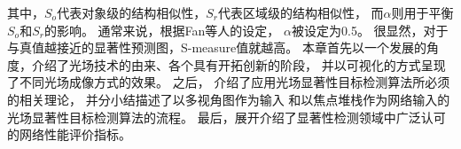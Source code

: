 %
%
其中，$S_{o}$代表对象级的结构相似性，$S_{r}$代表区域级的结构相似性，
而$\alpha$则用于平衡$S_{o}$和$S_{r}$的影响。
通常来说，根据Fan等人的设定，
$\alpha$被设定为0.5。
很显然，对于与真值越接近的显著性预测图，S-measure值就越高。
本章首先以一个发展的角度，介绍了光场技术的由来、各个具有开拓创新的阶段，
并以可视化的方式呈现了不同光场成像方式的效果。
之后，
介绍了应用光场显著性目标检测算法所必须的相关理论，
并分小结描述了以多视角图作为输入
和以焦点堆栈作为网络输入的
光场显著性目标检测算法的流程。
最后，展开介绍了显著性检测领域中广泛认可的网络性能评价指标。

